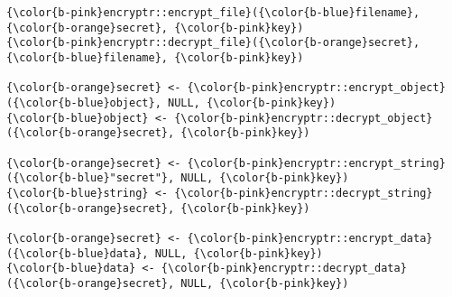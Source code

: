 \documentclass[class=minimal,border=0]{standalone}
\begin{document}
%
\begin{BVerbatim}[bgcolor=b-darkgrey]
{\color{b-pink}encryptr::encrypt_file}({\color{b-blue}filename}, {\color{b-orange}secret}, {\color{b-pink}key})
{\color{b-pink}encryptr::decrypt_file}({\color{b-orange}secret}, {\color{b-blue}filename}, {\color{b-pink}key})

{\color{b-orange}secret} <- {\color{b-pink}encryptr::encrypt_object}({\color{b-blue}object}, NULL, {\color{b-pink}key})
{\color{b-blue}object} <- {\color{b-pink}encryptr::decrypt_object}({\color{b-orange}secret}, {\color{b-pink}key})

{\color{b-orange}secret} <- {\color{b-pink}encryptr::encrypt_string}({\color{b-blue}"secret"}, NULL, {\color{b-pink}key})
{\color{b-blue}string} <- {\color{b-pink}encryptr::decrypt_string}({\color{b-orange}secret}, {\color{b-pink}key})

{\color{b-orange}secret} <- {\color{b-pink}encryptr::encrypt_data}({\color{b-blue}data}, NULL, {\color{b-pink}key})
{\color{b-blue}data} <- {\color{b-pink}encryptr::decrypt_data}({\color{b-orange}secret}, NULL, {\color{b-pink}key})
\end{BVerbatim}
\end{document}
